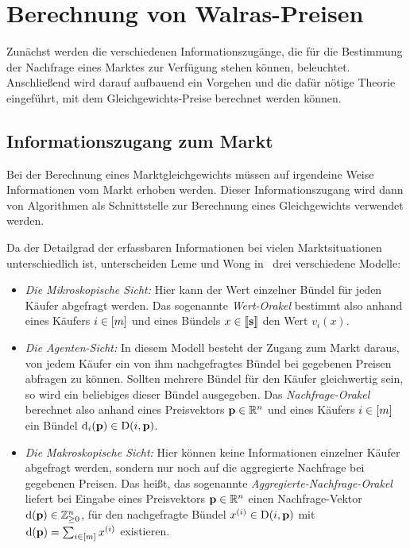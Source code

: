 \section{Berechnung von Walras-Preisen}\label{sec-computation}

Zunächst werden die verschiedenen Informationszugänge, die für die Bestimmung  der Nachfrage eines Marktes zur Verfügung stehen können, beleuchtet.
Anschließend wird darauf aufbauend ein Vorgehen und die dafür nötige Theorie eingeführt, mit dem Gleichge\-wichts-Preise berechnet werden können.

\subsection{Informationszugang zum Markt}\label{section-market-access}

Bei der Berechnung eines Marktgleichgewichts müssen auf irgendeine Weise Informationen vom Markt erhoben werden.
Dieser Informationszugang wird dann von Algorithmen als Schnittstelle zur Berechnung eines Gleichgewichts verwendet werden.

Da der Detailgrad der erfassbaren Informationen bei vielen Marktsituationen unterschiedlich ist, unterscheiden Leme und Wong in~\cite{PaesLeme2018} drei verschiedene Modelle:
\begin{itemize}
	\item \emph{Die Mikroskopische Sicht:} Hier kann der Wert einzelner Bündel für jeden Käufer abgefragt werden.
	Das sogenannte \emph{Wert-Orakel} bestimmt also anhand eines Käufers $i\in\left[ m \right]$ und eines Bündels $x\in\left\llbracket \mathbf{s} \right\rrbracket$ den Wert $v_i(x)$.
	\item \emph{Die Agenten-Sicht:} In diesem Modell besteht der Zugang zum Markt daraus, von jedem Käufer ein von ihm nachgefragtes Bündel bei gegebenen Preisen abfragen zu können.
	Sollten mehrere Bündel für den Käufer gleichwertig sein, so wird ein beliebiges dieser Bündel ausgegeben.
	Das \emph{Nachfrage-Orakel} berechnet also anhand eines Preisvektors $\mathbf{p}\in\mathbb{R}^n$ und eines Käufers $i\in\left[ m \right]$ ein Bündel $\operatorname{d}_i(\mathbf{p})\in\operatorname{D}(i, \mathbf{p})$.
	\item \emph{Die Makroskopische Sicht:} Hier können keine Informationen einzelner Käufer abgefragt werden, sondern nur noch auf die aggregierte Nachfrage bei gegebenen Preisen.
	Das heißt, das sogenannte \emph{Aggregierte-Nachfrage-Orakel} liefert bei Eingabe eines Preisvektors $\mathbf{p}\in\mathbb{R}^n$ einen Nachfrage-Vektor $\operatorname{d}(\mathbf{p})\in\mathbb{Z}_{\geq0}^n$, für den nachgefragte Bündel $x^{(i)} \in \operatorname{D}(i,\mathbf{p})$ mit $\operatorname{d}(\mathbf{p})=\sum_{i\in\left[ m \right]} x^{(i)}$ existieren.
\end{itemize}


